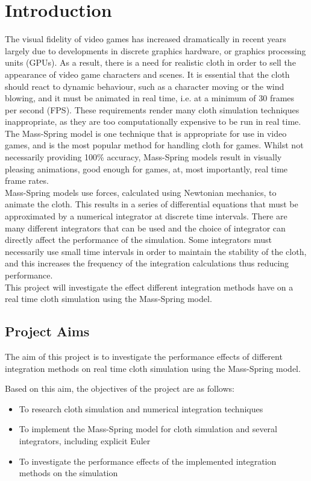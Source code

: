 \chapter{Introduction}

The visual fidelity of video games has increased dramatically in recent years largely due to developments in discrete graphics hardware, or graphics processing units (GPUs). As a result, there is a need for realistic cloth in order to sell the appearance of video game characters and scenes. It is essential that the cloth should react to dynamic behaviour, such as a character moving or the wind blowing, and it must be animated in real time, i.e. at a minimum of 30 frames per second (FPS). These requirements render many cloth simulation techniques inappropriate, as they are too computationally expensive to be run in real time. The Mass-Spring model is one technique that is appropriate for use in video games, and is the most popular method for handling cloth for games. Whilst not necessarily providing 100\% accuracy, Mass-Spring models result in visually pleasing animations, good enough for games, at, most importantly, real time frame rates.
\\Mass-Spring models use forces, calculated using Newtonian mechanics, to animate the cloth. This results in a series of differential equations that must be approximated by a numerical integrator at discrete time intervals. There are many different integrators that can be used and the choice of integrator can directly affect the performance of the simulation. Some integrators must necessarily use small time intervals in order to maintain the stability of the cloth, and this increases the frequency of the integration calculations thus reducing performance.
\\This project will investigate the effect different integration methods have on a real time cloth simulation using the Mass-Spring model.

\section{Project Aims}
The aim of this project is to investigate the performance effects of different integration methods on real time cloth simulation using the Mass-Spring model.

Based on this aim, the objectives of the project are as follows:
\begin{itemize}
\item {To research cloth simulation and numerical integration techniques }
\item {To implement the Mass-Spring model for cloth simulation and several integrators, including explicit Euler}
\item {To investigate the performance effects of the implemented integration methods on the simulation}
\end{itemize}

